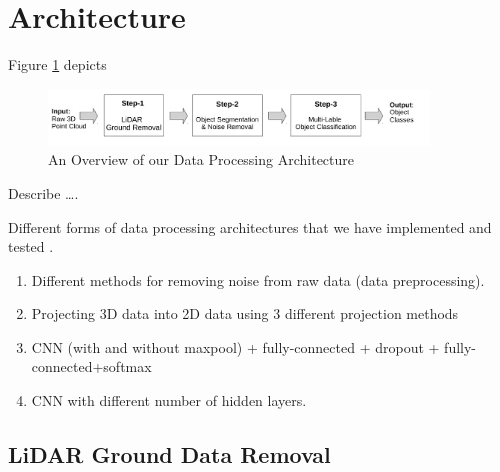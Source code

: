 \section{Architecture}\label{sec:Architecture}








Figure \ref{fig:dataPipeline} depicts  

\begin{figure}[h!]
 \begin{center}
   \includegraphics[width=0.9\textwidth]{./images/DataProcessingPipleline.pdf}
   \caption{An Overview of our Data Processing Architecture}
   \label{fig:dataPipeline}
 \end{center}
\end{figure}





Describe \ldots. 

Different forms of data processing architectures that we have implemented and tested . 

\begin{enumerate}
  \item Different methods for removing noise from raw data (data preprocessing). 
  \item Projecting 3D data into 2D data using 3 different projection methods 
  \item CNN  (with and without maxpool) + fully-connected + dropout + fully-connected+softmax
  \item CNN with different number of hidden layers. 

\end{enumerate}





\subsection{LiDAR Ground Data Removal}
% 


